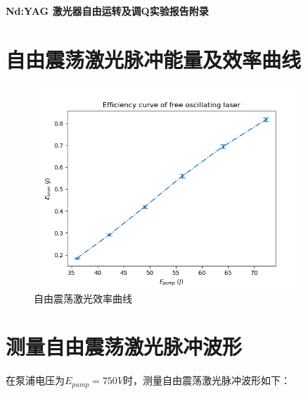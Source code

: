 \documentclass[a4paper,UTF8]{ctexart}
\begin{document}
\begin{center}
    \textbf{\Large Nd:YAG 激光器自由运转及调Q实验报告附录}
    \par {}
\end{center}

\section{自由震荡激光脉冲能量及效率曲线}

\begin{figure}[H]
    \centering
    \begin{minipage}[b]{0.9\textwidth}
        \centering
        \includegraphics[width=0.9\textwidth]{./ffig1.png}
        \caption{自由震荡激光效率曲线}
    \end{minipage}
\end{figure}

\section{测量自由震荡激光脉冲波形}

在泵浦电压为$E_{pump} = 750V$时，测量自由震荡激光脉冲波形如下：
\end{document}
